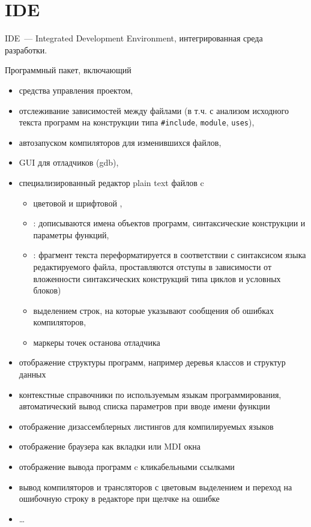 \part{IDE}

IDE\ --- Integrated Development Environment, интегрированная среда разработки.

Программный пакет, включающий 
\begin{itemize}
  \item средства управления проектом,
  \item отслеживание зависимостей между файлами (в т.ч. с анализом исходного
  текста программ на конструкции типа \verb|#include|, \verb|module|,
  \verb|uses|),
  \item автозапуском компиляторов для изменившихся файлов,
  \item GUI для отладчиков (gdb),
  \item специализированный редактор plain text
  файлов c
  \begin{itemize}
    \item цветовой и шрифтовой ,
  	\item {}: дописываются имена объектов программ, 
  	синтаксические конструкции и параметры функций,
  	\item {}: фрагмент текста переформатируется в
  	соответствии с синтаксисом языка редактируемого файла, проставляются отступы в
  	зависимости от вложенности синтаксических конструкций типа циклов и условных
  	блоков)
  	\item выделением строк, на которые указывают сообщения об ошибках
  	компиляторов,
  	\item маркеры точек останова отладчика
  \end{itemize}
  \item отображение структуры программ, например деревья классов и структур
  данных
  \item контекстные справочники по используемым языкам программирования,
  автоматический вывод списка параметров при вводе имени функции
  \item отображение дизассемблерных листингов для компилируемых языков
  \item отображение браузера как вкладки или MDI окна
  \item отображение вывода  программ c
  кликабельными ссылками
  \item вывод компиляторов и трансляторов с цветовым выделением и переход на
  ошибочную строку в редакторе при щелчке на ошибке
  \item \ldots
\end{itemize}

